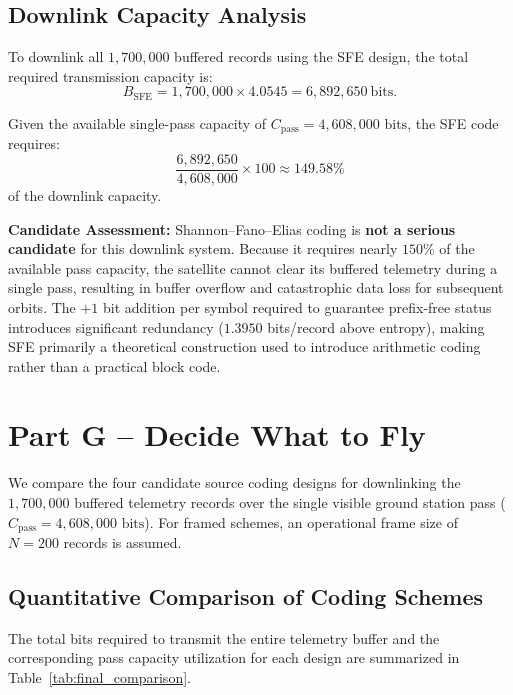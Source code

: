 \documentclass[11pt,a4paper]{article}
\begin{document}
\subsection{Downlink Capacity Analysis}

To downlink all $1,700,000$ buffered records using the SFE design, the total required transmission capacity is:
\begin{equation}
    B_{\mathrm{SFE}} = 1,700,000 \times 4.0545 = \boxed{6,892,650\ \text{bits}}.
\end{equation}

Given the available single-pass capacity of $C_{\mathrm{pass}} = 4,608,000\text{ bits}$, the SFE code requires:
\begin{equation}
    \frac{6,892,650}{4,608,000} \times 100 \approx \boxed{149.58\%}
\end{equation}
of the downlink capacity.

\textbf{Candidate Assessment:}
Shannon--Fano--Elias coding is \textbf{not a serious candidate} for this downlink system. Because it requires nearly $150\%$ of the available pass capacity, the satellite cannot clear its buffered telemetry during a single pass, resulting in buffer overflow and catastrophic data loss for subsequent orbits. The $+1$ bit addition per symbol required to guarantee prefix-free status introduces significant redundancy ($1.3950$ bits/record above entropy), making SFE primarily a theoretical construction used to introduce arithmetic coding rather than a practical block code.

\section{Part G -- Decide What to Fly}

We compare the four candidate source coding designs for downlinking the $1,700,000$ buffered telemetry records over the single visible ground station pass ($C_{\mathrm{pass}} = 4,608,000\text{ bits}$). For framed schemes, an operational frame size of $N = 200$ records is assumed.

\subsection{Quantitative Comparison of Coding Schemes}

The total bits required to transmit the entire telemetry buffer and the corresponding pass capacity utilization for each design are summarized in Table~\ref{tab:final_comparison}.
\end{document}

